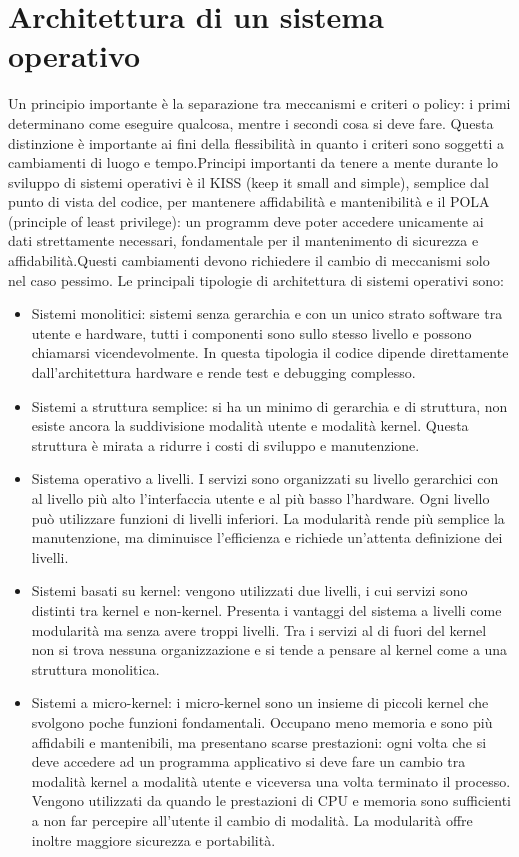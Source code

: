 \chapter{Architettura di un sistema operativo}
Un principio importante \`e la separazione tra meccanismi e criteri o policy: i primi determinano come eseguire qualcosa, mentre i secondi cosa si deve fare. Questa distinzione \`e importante ai fini della
flessibilit\`a in quanto i criteri sono soggetti a cambiamenti di luogo e tempo.Principi importanti da tenere a mente durante lo sviluppo di sistemi operativi \`e il KISS (keep it small
and simple), semplice dal punto di vista del codice, per mantenere affidabilit\`a e mantenibilit\`a e il POLA (principle of least privilege): un programm deve poter accedere unicamente ai
dati strettamente necessari, fondamentale per il mantenimento di sicurezza e affidabilit\`a.Questi cambiamenti devono richiedere il cambio di meccanismi solo nel caso pessimo. Le 
principali tipologie di architettura di sistemi operativi sono:
\begin{itemize}
	\item Sistemi monolitici: sistemi senza gerarchia e con un unico strato software tra utente e hardware, tutti i componenti sono sullo stesso 
		livello e possono chiamarsi vicendevolmente. In questa tipologia il codice dipende direttamente dall'architettura hardware e rende test
		e debugging complesso.
	\item Sistemi a struttura semplice: si ha un minimo di gerarchia e di struttura, non esiste  ancora la suddivisione modalità utente e modalità kernel. Questa struttura \`e mirata a ridurre i costi di sviluppo e manutenzione.
	\item Sistema operativo a livelli. I servizi sono organizzati su livello gerarchici con al livello pi\`u alto l'interfaccia utente e al pi\`u 
		basso l'hardware. Ogni livello pu\`o utilizzare funzioni di livelli inferiori. La modularit\`a rende pi\`u semplice la manutenzione, ma
		diminuisce l'efficienza e richiede un'attenta definizione dei livelli. 
	\item Sistemi basati su kernel: vengono utilizzati due livelli, i cui servizi sono distinti tra kernel e non-kernel. Presenta i vantaggi del sistema a livelli come modularit\`a
		ma senza avere troppi livelli. Tra i servizi al di fuori del kernel non si trova nessuna organizzazione e si tende a pensare al kernel come a una struttura monolitica.
	\item Sistemi a micro-kernel: i micro-kernel sono un insieme di piccoli kernel che svolgono poche funzioni fondamentali. Occupano meno memoria e sono pi\`u affidabili e 
		mantenibili, ma presentano scarse prestazioni: ogni volta che si deve accedere ad un programma applicativo si deve fare un cambio tra modalit\`a kernel a modalit\`a
		utente e viceversa una volta terminato il processo. Vengono utilizzati da quando le prestazioni di CPU e memoria sono sufficienti a non far percepire all'utente il cambio
		di modalit\`a. La modularit\`a offre inoltre maggiore sicurezza e portabilit\`a.
\end{itemize}
